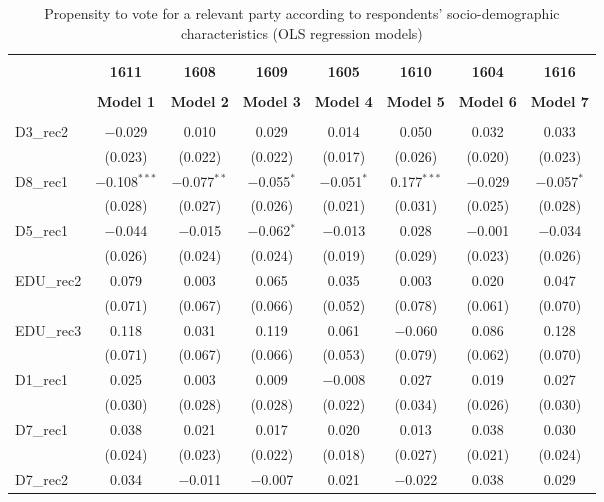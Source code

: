 \documentclass[
]{article}
\begin{document}
\begin{table}[!htbp] \centering 
  \caption{Propensity to vote for a relevant party according to respondents' 
                     socio-demographic characteristics (OLS regression models)} 
  \label{table:full_ols_lv} 
\begin{tabular}{@{\extracolsep{5pt}}lccccccc} 
\\[-1.8ex]\hline \\[-1.8ex] 
 & \textbf{1611} & \textbf{1608} & \textbf{1609} & \textbf{1605} & \textbf{1610} & \textbf{1604} & \textbf{1616} \\ 
\\[-1.8ex] & \textbf{Model 1} & \textbf{Model 2} & \textbf{Model 3} & \textbf{Model 4} & \textbf{Model 5} & \textbf{Model 6} & \textbf{Model 7}\\ 
\hline \\[-1.8ex] 
 D3\_rec2 & $-$0.029 & 0.010 & 0.029 & 0.014 & 0.050 & 0.032 & 0.033 \\ 
  & (0.023) & (0.022) & (0.022) & (0.017) & (0.026) & (0.020) & (0.023) \\ 
  D8\_rec1 & $-$0.108$^{***}$ & $-$0.077$^{**}$ & $-$0.055$^{*}$ & $-$0.051$^{*}$ & 0.177$^{***}$ & $-$0.029 & $-$0.057$^{*}$ \\ 
  & (0.028) & (0.027) & (0.026) & (0.021) & (0.031) & (0.025) & (0.028) \\ 
  D5\_rec1 & $-$0.044 & $-$0.015 & $-$0.062$^{*}$ & $-$0.013 & 0.028 & $-$0.001 & $-$0.034 \\ 
  & (0.026) & (0.024) & (0.024) & (0.019) & (0.029) & (0.023) & (0.026) \\ 
  EDU\_rec2 & 0.079 & 0.003 & 0.065 & 0.035 & 0.003 & 0.020 & 0.047 \\ 
  & (0.071) & (0.067) & (0.066) & (0.052) & (0.078) & (0.061) & (0.070) \\ 
  EDU\_rec3 & 0.118 & 0.031 & 0.119 & 0.061 & $-$0.060 & 0.086 & 0.128 \\ 
  & (0.071) & (0.067) & (0.066) & (0.053) & (0.079) & (0.062) & (0.070) \\ 
  D1\_rec1 & 0.025 & 0.003 & 0.009 & $-$0.008 & 0.027 & 0.019 & 0.027 \\ 
  & (0.030) & (0.028) & (0.028) & (0.022) & (0.034) & (0.026) & (0.030) \\ 
  D7\_rec1 & 0.038 & 0.021 & 0.017 & 0.020 & 0.013 & 0.038 & 0.030 \\ 
  & (0.024) & (0.023) & (0.022) & (0.018) & (0.027) & (0.021) & (0.024) \\ 
  D7\_rec2 & 0.034 & $-$0.011 & $-$0.007 & 0.021 & $-$0.022 & 0.038 & 0.029 \\ 

\end{tabular}
\end{table}
\end{document}
